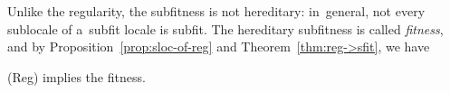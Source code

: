 \begin{rem}[Fitness]
  Unlike the regularity, the subfitness is not hereditary:
  in~general, not every sublocale of a~subfit locale is subfit.
  The hereditary subfitness is called \emph{fitness\/}, and by
  Proposition~\ref{prop:sloc-of-reg} and Theorem~\ref{thm:reg->sfit}, we have
\end{rem}
\begin{obs}
  (Reg) implies the fitness.
\end{obs}
